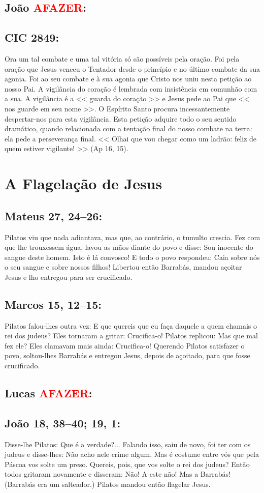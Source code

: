 \documentclass[10pt,a5paper]{book}
\newcommand{\from}[1]{\subsection*{#1}}
\newcommand{\TODO}{\textcolor{red}{\ttfamily AFAZER}}
\begin{document}
\from{João \TODO:}

\from{CIC 2849:}

Ora um tal combate e uma tal vitória só são possíveis pela oração.
Foi pela oração que Jesus venceu o Tentador desde o princípio e no último combate da sua agonia.
Foi ao seu combate e à sua agonia que Cristo nos uniu nesta petição ao nosso Pai.
A vigilância do coração é lembrada com insistência em comunhão com a sua.
A vigilância é a << guarda do coração >> e Jesus pede ao Pai que << nos guarde em seu nome >>.
O Espírito Santo procura incessantemente despertar-nos para esta vigilância.
Esta petição adquire todo o seu sentido dramático, quando relacionada com a tentação final do nosso combate na terra:
ela pede a perseverança final.
<< Olhai que vou chegar como um ladrão: feliz de quem estiver vigilante! >> (Ap 16, 15).


\section{A Flagelação de Jesus}

\from{Mateus 27, 24--26:}

Pilatos viu que nada adiantava, mas que, ao contrário, o tumulto crescia.
Fez com que lhe trouxessem água, lavou as mãos diante do povo e disse:
Sou inocente do sangue deste homem.
Isto é lá convosco!
E todo o povo respondeu:
Caia sobre nós o seu sangue e sobre nossos filhos!
Libertou então Barrabás, mandou açoitar Jesus e lho entregou para ser crucificado.

\from{Marcos 15, 12--15:}

Pilatos falou-lhes outra vez: E que quereis que eu faça daquele a quem chamais o rei dos judeus?
Eles tornaram a gritar: Crucifica-o!
Pilatos replicou:
Mas que mal fez ele?
Eles clamavam mais ainda: Crucifica-o!
Querendo Pilatos satisfazer o povo, soltou-lhes Barrabás e entregou Jesus, depois de açoitado, para que fosse crucificado.

\from{Lucas \TODO:}

\from{João 18, 38--40; 19, 1:}

Disse-lhe Pilatos: Que é a verdade?...
Falando isso, saiu de novo, foi ter com os judeus e disse-lhes:
Não acho nele crime algum.
Mas é costume entre vós que pela Páscoa vos solte um preso.
Quereis, pois, que vos solte o rei dos judeus?
Então todos gritaram novamente e disseram:
Não! A este não! Mas a Barrabás! (Barrabás era um salteador.)
Pilatos mandou então flagelar Jesus.
\end{document}
